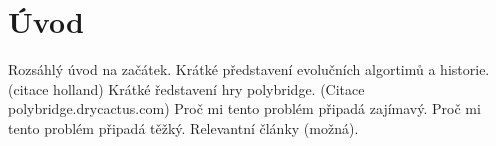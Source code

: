 \chapter*{Úvod}


Rozsáhlý úvod na začátek. 
Krátké představení evolučních algortimů a historie. (citace holland)
Krátké ředstavení hry polybridge. (Citace polybridge.drycactus.com)
Proč mi tento problém připadá zajímavý.
Proč mi tento problém připadá těžký.
Relevantní články (možná). 

